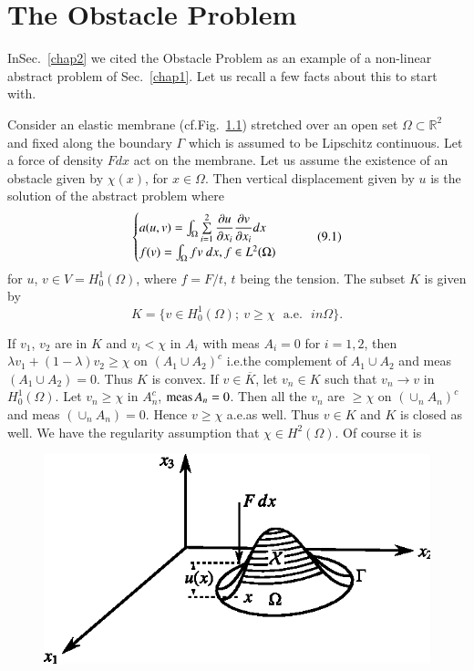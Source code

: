 
\chapter{The Obstacle Problem}\label{chap9}

In\pageoriginale Sec.~\ref{chap2} we cited the Obstacle Problem as an
example of a non-linear abstract problem of Sec.~\ref{chap1}. Let us
recall a few facts about this to start with.

Consider an elastic membrane (cf.\@ Fig.~\ref{chap9-fig9.1})
stretched over an open set $\Omega\subset \mathbb{R}^{2}$ and fixed
along the boundary $\Gamma$ which is assumed to be Lipschitz
continuous. Let a force of density $Fdx$ act on the membrane. Let us
assume the existence of an obstacle given by $\chi(x)$, for
$x\in\Omega$. Then vertical displacement given by $u$ is the solution
of the abstract problem where
\begin{equation*}
\begin{cases}
a(u,v)=\int_{\Omega}\sum\limits^{2}_{i=1}\dfrac{\partial u}{\partial
  x_{i}}\dfrac{\partial v}{\partial x_{i}}dx\\
f(v)=\int_{\Omega}fv\ dx, f\in L^{2}(\Omega)
\end{cases}\tag{9.1}\label{chap9-eq9.1}
\end{equation*}
for $u$, $v\in V=H^{1}_{0}(\Omega)$, where $f=F/t$, $t$ being the
tension. The subset $K$ is given by
$$
K=\{v\in H^{1}_{0}(\Omega);\ v\geq \chi \text{~ a.e.~ } in \Omega\}.
$$

If $v_{1}$, $v_{2}$ are in $K$ and $v_{i}<\chi$ in $A_{i}$ with meas
$A_{i}=0$ for $i=1,2$, then $\lambda v_{1}+(1-\lambda)v_{2}\geq \chi$
on $(A_{1}\cup A_{2})^{c}$ i.e.\@ the complement of $A_{1}\cup A_{2}$
and meas $(A_{1}\cup A_{2})=0$. Thus $K$ is convex. If
$v\in\overline{K}$, let $v_{n}\in K$ such that $v_{n}\to v$ in
$H^{1}_{0}(\Omega)$. Let $v_{n}\geq \chi$ in $A^{c}_{n}$, $\operatorname{meas}
A_{n}=0$. Then all the $v_{n}$ are $\geq \chi$ on
$(\cup_{n}A_{n})^{c}$ and meas $(\cup_{n}A_{n})=0$. Hence $v\geq \chi$
a.e.\@ as well. Thus $v\in K$ and $K$ is closed as well. We have the
regularity assumption that $\chi\in H^{2}(\Omega)$. Of course it is 
\begin{figure}[H]
\centering
\includegraphics{figure/fig9.1.eps}
\caption{}\label{chap9-fig9.1}
\end{figure}\pageoriginale

